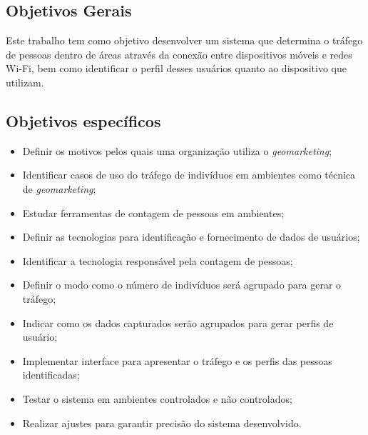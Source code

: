 \subsection{Objetivos Gerais}
Este trabalho tem como objetivo desenvolver um sistema que determina o tráfego de pessoas dentro de áreas através da conexão entre dispositivos móveis e redes
Wi-Fi, bem como identificar o perfil desses usuários quanto ao dispositivo que utilizam.

\subsection{Objetivos específicos}
\begin{itemize}
  \item Definir os motivos pelos quais uma organização utiliza o \emph{geomarketing};
  \item Identificar casos de uso do tráfego de indivíduos em ambientes como técnica
  de \emph{geomarketing};
  \item Estudar ferramentas de contagem de pessoas em ambientes;
  \item Definir as tecnologias para identificação e fornecimento de dados de usuários;
  \item Identificar a tecnologia responsável pela contagem de pessoas;
  \item Definir o modo como o número de indivíduos será agrupado para gerar o tráfego;
  \item Indicar como os dados capturados serão agrupados para gerar perfis de usuário;
  \item Implementar interface para apresentar o tráfego e os perfis das pessoas identificadas;
  \item Testar o sistema em ambientes controlados e não controlados;
  \item Realizar ajustes para garantir precisão do sistema desenvolvido.
\end{itemize}
